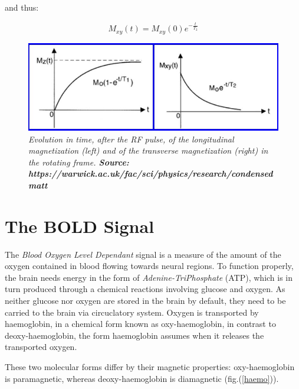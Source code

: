 \documentclass[12pt,openright,twoside,a4paper]{book}
\begin{document}
and thus:

\begin{equation}
M_{xy}(t)=M_{xy}(0)e^{-\frac{t}{T_2}}
\end{equation}

\begin{figure}[!h]
\centering
\includegraphics[scale=0.5]{relaxation}
\caption{\textit{ Evolution in time, after the RF pulse, of the longitudinal magnetization (left) and of the transverse magnetization (right) in the rotating frame. \textbf{Source: https://warwick.ac.uk/fac/sci/physics/research/condensedmatt}}}
\label{relaxation}
\end{figure}

\section{The BOLD Signal}

The \textit{Blood Oxygen Level Dependant} signal  is a measure of the amount of the oxygen contained in blood flowing towards neural regions.
To function properly, the brain needs energy in the form of \textit{Adenine-TriPhosphate} (ATP), which is in turn produced through a chemical reactions involving glucose and oxygen.
As neither glucose nor oxygen are stored in the brain by default, they need to be carried to the brain via circuclatory system. 
Oxygen is transported by haemoglobin, in a chemical form  known as oxy-haemoglobin, in contrast to deoxy-haemoglobin, the form haemoglobin assumes when it releases the transported oxygen.

These two molecular forms differ by their magnetic properties: oxy-haemoglobin is paramagnetic, whereas deoxy-haemoglobin is diamagnetic (fig.(\ref{haemo})).
\end{document}
